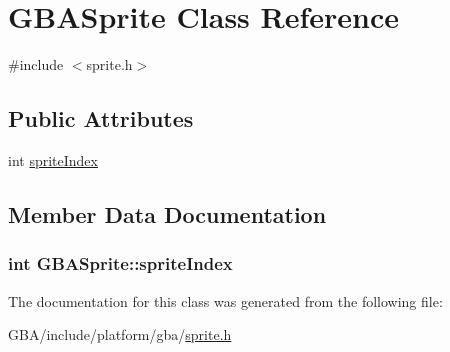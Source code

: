 \hypertarget{class_g_b_a_sprite}{\section{G\-B\-A\-Sprite Class Reference}
\label{class_g_b_a_sprite}
}


{\ttfamily \#include $<$sprite.\-h$>$}

\subsection*{Public Attributes}
\begin{DoxyCompactItemize}
\item 
int \hyperlink{class_g_b_a_sprite_a7ec5124ff20f8f8adbd90665bd63fd14}{sprite\-Index}
\end{DoxyCompactItemize}


\subsection{Member Data Documentation}
\hypertarget{class_g_b_a_sprite_a7ec5124ff20f8f8adbd90665bd63fd14}{
\subsubsection[{sprite\-Index}]{\setlength{\rightskip}{0pt plus 5cm}int {\bf G\-B\-A\-Sprite\-::sprite\-Index}}}\label{class_g_b_a_sprite_a7ec5124ff20f8f8adbd90665bd63fd14}


The documentation for this class was generated from the following file\-:\begin{DoxyCompactItemize}
\item 
G\-B\-A/include/platform/gba/\hyperlink{_g_b_a_2include_2platform_2gba_2sprite_8h}{sprite.\-h}\end{DoxyCompactItemize}
